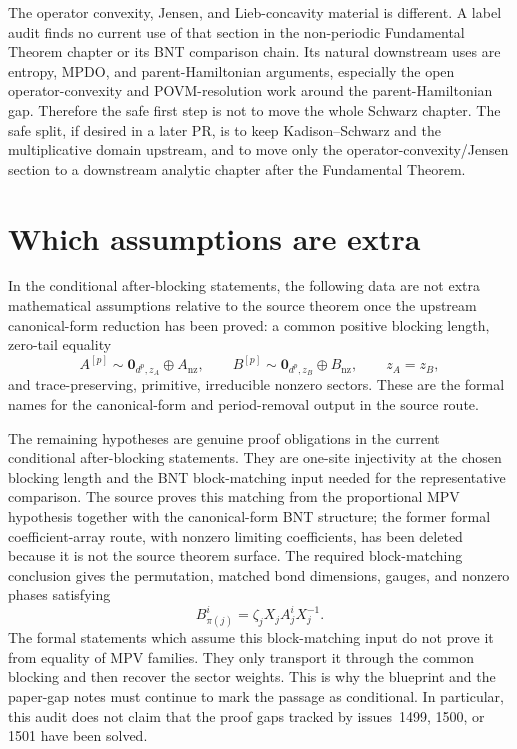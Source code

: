 \documentclass{article}
\begin{document}
The operator convexity, Jensen, and Lieb-concavity material is different. A
label audit finds no current use of that section in the non-periodic Fundamental
Theorem chapter or its BNT comparison chain. Its natural downstream uses are
entropy, MPDO, and parent-Hamiltonian arguments, especially the open
operator-convexity and POVM-resolution work around the parent-Hamiltonian gap.
Therefore the safe first step is not to move the whole Schwarz chapter. The
safe split, if desired in a later PR, is to keep Kadison--Schwarz and the
multiplicative domain upstream, and to move only the operator-convexity/Jensen
section to a downstream analytic chapter after the Fundamental Theorem.

\section{Which assumptions are extra}

In the conditional after-blocking statements, the following data are not extra
mathematical assumptions relative to the source theorem once the upstream
canonical-form reduction has been proved: a common positive blocking length,
zero-tail equality
\[
  A^{[p]}\sim \mathbf{0}_{d^p,z_A}\oplus A_{\mathrm{nz}},
  \qquad
  B^{[p]}\sim \mathbf{0}_{d^p,z_B}\oplus B_{\mathrm{nz}},
  \qquad z_A=z_B,
\]
and trace-preserving, primitive, irreducible nonzero sectors. These are the
formal names for the canonical-form and period-removal output in the source
route.

The remaining hypotheses are genuine proof obligations in the current
conditional after-blocking statements. They are one-site injectivity at the
chosen blocking length and the BNT block-matching input needed for the
representative comparison. The source proves this matching from the
proportional MPV hypothesis together with the canonical-form BNT structure; the
former formal coefficient-array route, with nonzero limiting coefficients, has
been deleted because it is not the source theorem surface. The required
block-matching conclusion gives the permutation, matched bond dimensions,
gauges, and nonzero phases satisfying
\[
  B_{\pi(j)}^i=\zeta_j X_j A_j^i X_j^{-1}.
\]
The formal statements which assume this block-matching input do not prove it
from equality of MPV families. They only transport it through the common
blocking and then recover the sector weights. This is why the blueprint and the
paper-gap notes must continue to mark the passage as conditional. In particular,
this audit does not claim that the proof gaps tracked by
issues~1499, 1500, or 1501 have been solved.
\end{document}
